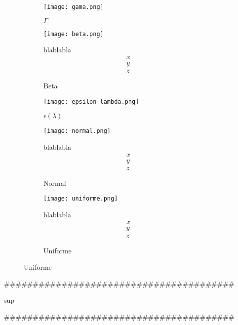\begin{figure}[H]
	\begin{subfigure}[t]{.5\textwidth}
		\texttt{[image: gama.png]}
		\caption{$\Gamma$}
	\end{subfigure}\qquad
\begin{subfigure}[t]{.5\textwidth}\centering
		\texttt{[image: beta.png]}\caption{Beta}
		blablabla
		\begin{equation}
		\begin{matrix}
		x\\
		y\\
		z
		\end{matrix}
		\end{equation}
	\end{subfigure}	
	\begin{subfigure}[t]{.5\textwidth}
		\texttt{[image: epsilon\_lambda.png]}
		\caption{$\epsilon(\lambda)$}
	\end{subfigure}\qquad
\begin{subfigure}[t]{.5\textwidth}
		\texttt{[image: normal.png]}\caption{Normal}
		blablabla
		\begin{equation}
		\begin{matrix}
		x\\
		y\\
		z
		\end{matrix}
		\end{equation}
	\end{subfigure}\qquad
\begin{subfigure}[t]{.5\textwidth}
		\texttt{[image: uniforme.png]}\caption{Uniforme}
		blablabla
		\begin{equation}
		\begin{matrix}
		x\\
		y\\
		z
		\end{matrix}
		\end{equation}
	\end{subfigure}
\end{figure}
\#\#\#\#\#\#\#\#\#\#\#\#\#\#\#\#\#\#\#\#\#\#\#\#\#\#\#\#\#\#\#\#\#\#\#\#\#\#\#\#
\begin{center}sup\end{center}

\#\#\#\#\#\#\#\#\#\#\#\#\#\#\#\#\#\#\#\#\#\#\#\#\#\#\#\#\#\#\#\#\#\#\#\#\#\#\#\#\\